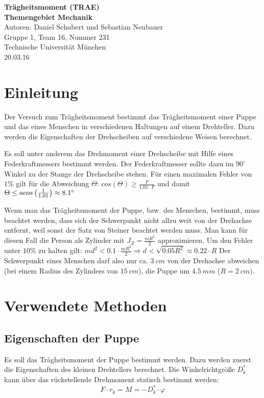\documentclass[a4paper, 11pt, ngerman]{scrartcl}
\newcommand{\stand}{20.03.16}
\begin{document}
\thispagestyle{empty}
\begin{center}
\textbf{\Large Trägheitsmoment (TRAE)}\\[1ex]
\textbf{\large Themengebiet Mechanik}\\[5ex]
       Autoren: Daniel Schubert und Sebastian Neubauer\\
       Gruppe 1, Team 16, Nummer 231\\
       Technische Universität München\\[1ex]
       \stand
\end{center}

\tableofcontents
\clearpage

\section{Einleitung}\label{sec:einleitung}
Der Versuch zum Trägheitsmoment bestimmt das Trägheitsmoment einer Puppe und das eines Menschen in verschiedenen Haltungen auf einem Drehteller. Dazu werden die Eigenschaften der Drehscheiben auf verschiedene Weisen berechnet.

Es soll unter anderem das Drehmoment einer Drehscheibe mit Hilfe eines Federkraftmessers bestimmt werden. Der Federkraftmesser sollte dazu im $90^\circ$ Winkel zu der Stange der Drehscheibe stehen. Für einen maximalen Fehler von $1\%$ gilt für die Abweichung $\Theta$: $cos(\Theta) \ge \frac{F}{1.01 \cdot F}$ und damit $\Theta \le acos\left(1 \over 1.01\right) \approx 8.1^\circ$

Wenn man das Trägheitsmoment der Puppe, bzw. des Menschen, bestimmt, muss beachtet werden, dass sich der Schwerpunkt nicht allzu weit von der Drehachse entfernt, weil sonst der Satz von Steiner beachtet werden muss. Man kann für diesen Fall die Person als Zylinder mit $J_Z = \frac{mR^2}{2}$ approximieren. Um den Fehler unter $10\%$ zu halten gilt: $md^2 < 0.1 \cdot \frac{mR^2}{2} \Rightarrow d < \sqrt{0.05 R^2} \approx 0.22 \cdot R$ Der Schwerpunkt eines Menschen darf also nur ca. $\SI{3}{cm}$ von der Drehachse abweichen (bei einem Radius des Zylinders von $\SI{15}{cm}$), die Puppe um $\SI{4.5}{mm}$ ($R = \SI{2}{cm})$.

\section{Verwendete Methoden}
\subsection{Eigenschaften der Puppe}
Es soll das Trägheitsmoment der Puppe bestimmt werden. Dazu werden zuerst die Eigenschaften des kleinen Drehtellers berechnet. Die Winkelrichtgröße $D^*_k$ kann über das rückstellende Drehmoment statisch bestimmt werden:
\begin{equation}\label{equ:Drehmoment}
F \cdot r_k = M = -D^*_k \cdot \varphi
\end{equation}
\end{document}
